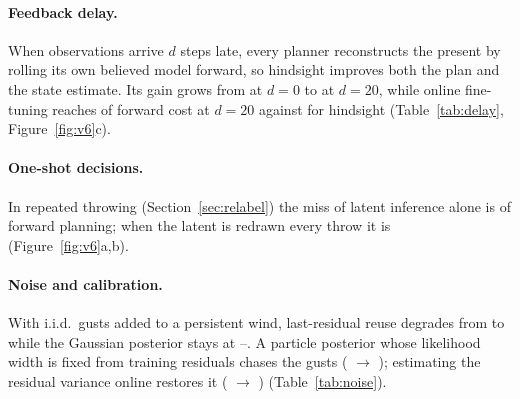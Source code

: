 \documentclass[11pt]{article}
\begin{document}
\paragraph{Feedback delay.} When observations arrive $d$ steps late, every planner reconstructs the present by rolling
its own believed model forward, so hindsight improves both the plan and the state estimate. Its gain grows from
\dlGainZero{} at $d=0$ to \dlGainTwenty{} at $d=20$, while online fine-tuning reaches \dlSgdTwenty{} of forward cost at
$d=20$ against \dlPostTwenty{} for hindsight (Table~\ref{tab:delay}, Figure~\ref{fig:v6}c).

\paragraph{One-shot decisions.} In repeated throwing (Section~\ref{sec:relabel}) the miss of latent inference alone is
\twHindBoth{} of forward planning; when the latent is redrawn every throw it is \twHindFresh{} (Figure~\ref{fig:v6}a,b).

\paragraph{Noise and calibration.} With i.i.d.\ gusts added to a persistent wind, last-residual reuse degrades from
\nzResidZero{} to \nzResidOne{} while the Gaussian posterior stays at \nzPostZero{}--\nzPostOne{}. A particle posterior
whose likelihood width is fixed from training residuals chases the gusts (\nzFixedZero{} $\to$ \nzFixedOne); estimating
the residual variance online restores it (\nzAdaptZero{} $\to$ \nzAdaptOne) (Table~\ref{tab:noise}).

\begin{table}[t]\centering\scriptsize
\begin{minipage}{0.49\linewidth}\centering{}\label{tab:k}\end{minipage}\hfill
\begin{minipage}{0.49\linewidth}\centering{}\label{tab:rho}\end{minipage}
\vspace{0.5em}

\begin{minipage}{0.49\linewidth}\centering{}\label{tab:delay}\end{minipage}\hfill
\begin{minipage}{0.49\linewidth}\centering{}\label{tab:noise}\end{minipage}
\end{table}
\end{document}
